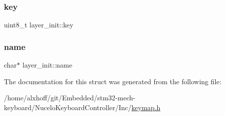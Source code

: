 \subsubsection{\texorpdfstring{key}{key}}
{\footnotesize\ttfamily uint8\+\_\+t layer\+\_\+init\+::key}

\mbox{\label{structlayer__init_a19f2d1d9aa1c2beccc6f6ea8fec0f8b4}} 
\subsubsection{\texorpdfstring{name}{name}}
{\footnotesize\ttfamily char$\ast$ layer\+\_\+init\+::name}



The documentation for this struct was generated from the following file\+:\begin{DoxyCompactItemize}
\item 
/home/alxhoff/git/\+Embedded/stm32-\/mech-\/keyboard/\+Nucelo\+Keyboard\+Controller/\+Inc/\hyperlink{keymap_8h}{keymap.\+h}\end{DoxyCompactItemize}
